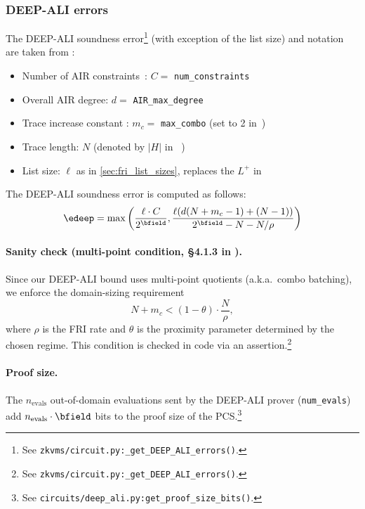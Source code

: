\subsubsection{DEEP-ALI errors}\label{sec:fri-deep-ali}

The DEEP-ALI soundness error\footnote{See \texttt{zkvms/circuit.py:\_get\_DEEP\_ALI\_errors()}.} (with exception of the list size) and notation are taken from \cite[Section 5.2]{habock2022summary}:
\begin{itemize}
    \item Number of AIR constraints~\cite[p.15]{habock2022summary}: $C=$ \texttt{num\_constraints}
    \item Overall AIR degree: $d =$ \texttt{AIR\_max\_degree}
    \item Trace increase constant \cite[Remark 7]{habock2022summary}: $m_c=$ \texttt{max\_combo} (set to 2 in~\cite{habock2022summary})
    \item Trace length: $N$ (denoted by $|H|$ in ~\cite{habock2022summary})
    \item List size: $\ell$ as in \cref{sec:fri_list_sizes}, replaces the $L^{+}$ in ~\cite{habock2022summary}
\end{itemize}

The DEEP-ALI soundness error is computed as follows:
\begin{equation}
    \edeep = \max\left(\frac{\ell\cdot C}{2^{\bfield}}, \frac{\ell(d(N+m_c-1)+(N-1))}{2^{\bfield}-N-N/\rho}\right)
\end{equation}

\paragraph{Sanity check (multi-point condition, \S4.1.3 in \cite{habock2022summary}).}
Since our DEEP-ALI bound uses multi-point quotients (a.k.a.\ combo batching), we enforce the domain-sizing requirement
\begin{equation}\label{eq:multipoint_condition}
    N + m_c < (1-\theta)\cdot \frac{N}{\rho},
\end{equation}
where $\rho$ is the FRI rate and $\theta$ is the proximity parameter determined by the chosen regime.
This condition is checked in code via an assertion.\footnote{See \texttt{zkvms/circuit.py:\_get\_DEEP\_ALI\_errors()}.}

\paragraph{Proof size.}
The $n_{\mathrm{evals}}$ out-of-domain evaluations sent by the DEEP-ALI prover (\verb|num_evals|) add $n_{\mathrm{evals}} \cdot \bfield$ bits to the proof size of the PCS.\footnote{See \texttt{circuits/deep\_ali.py:get\_proof\_size\_bits()}.}

